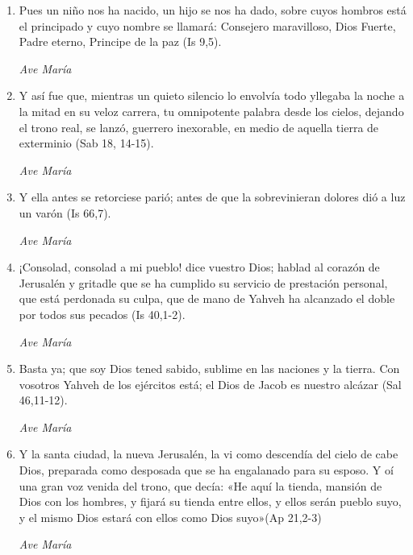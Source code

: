 \documentclass[a4paper,11pt, oneside]{report}
\begin{document}
        \begin{enumerate}
          
          \item Pues un niño nos ha nacido, un hijo se nos ha dado, sobre cuyos hombros está el principado y cuyo nombre se llamará: Consejero maravilloso, Dios Fuerte, Padre eterno, Principe de la paz (Is 9,5).
          
          \textit{Ave María}

          \item Y así fue que, mientras un quieto silencio lo envolvía todo yllegaba la noche a la mitad en su veloz carrera, tu omnipotente palabra desde los cielos, dejando el trono real, se lanzó, guerrero inexorable, en medio de aquella tierra de exterminio (Sab 18, 14-15).
          
          \textit{Ave María}

          \item Y ella antes se retorciese parió; antes de que la sobrevinieran dolores dió a luz un varón (Is 66,7).
          
          \textit{Ave María}

          \item ¡Consolad, consolad a mi pueblo! dice vuestro Dios; hablad al corazón de Jerusalén y gritadle que se ha cumplido su servicio de prestación personal, que está perdonada su culpa, que de mano de Yahveh ha alcanzado el doble por todos sus pecados (Is 40,1-2).
          
          \textit{Ave María}

          \item Basta ya; que soy Dios tened sabido, sublime en las naciones y la tierra. Con vosotros Yahveh de los ejércitos está; el Dios de Jacob es nuestro alcázar (Sal 46,11-12).

          \textit{Ave María}

          \item Y la santa ciudad, la nueva Jerusalén, la vi como descendía del cielo de cabe Dios, preparada como desposada que se ha engalanado para su esposo. Y oí una gran voz venida del trono, que decía: «He aquí la tienda, mansión de Dios con los hombres, y fijará su tienda entre ellos, y ellos serán pueblo suyo, y el mismo Dios estará con ellos como Dios suyo»(Ap 21,2-3)
          
          \textit{Ave María}


\end{enumerate}
\end{document}
